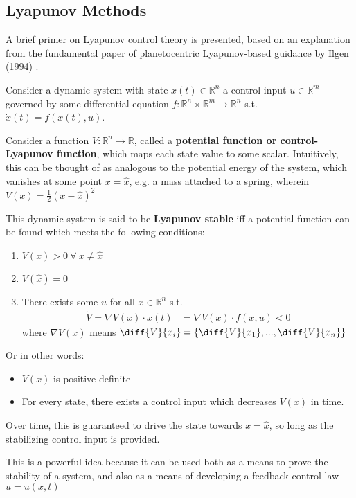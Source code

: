 \subsection{Lyapunov Methods}
A brief primer on Lyapunov control theory is presented, based on an explanation from the fundamental paper of planetocentric Lyapunov-based guidance by Ilgen (1994) \cite{ilgen1994low}.

Consider a dynamic system with state \(x(t) \in \mathbb{R}^n\) a control input \(u \in \mathbb{R}^m\) governed by some differential equation \(f : \mathbb{R}^n \times \mathbb{R}^m \to \mathbb{R}^n\) s.t. \(\dot{x}(t) = f(x(t), u)\).

Consider a function \(V: \mathbb{R}^n \to \mathbb{R}\), called a \textbf{potential function or control-Lyapunov function}, which maps each state value to some scalar. Intuitively, this can be thought of as analogous to the potential energy of the system, which vanishes at some point \(x = \hat{x}\), e.g. a mass attached to a spring, wherein \(V(x) = \frac{1}{2}(x-\hat{x})^2\)

This dynamic system is said to be \textbf{Lyapunov stable} iff a potential function can be found which meets the following conditions:
\begin{enumerate}
  \item \(V(x) > 0\  \forall \ x \neq \hat{x}\)
  \item \(V(\hat{x}) = 0\)
  \item There exists some \(u\) for all \(x \in \mathbb{R}^n\) s.t.
        \begin{align*}
          \dot{V}= \nabla V(x) \cdot \dot{x}(t) & = \nabla V(x) \cdot f(x, u) < 0
        \end{align*}
        where \(\nabla V(x)\) means \(\diff{V}{{x_i}} = \left\{\diff{V}{{x_1}}, ..., \diff{V}{{x_n}}  \right\}\)
\end{enumerate}
Or in other words:
\begin{itemize}
  \item \(V(x)\) is positive definite
  \item For every state, there exists a control input which decreases \(V(x)\) in time.
\end{itemize}

Over time, this is guaranteed to drive the state towards \(x = \hat{x}\), so long as the stabilizing control input is provided.

This is a powerful idea because it can be used both as a means to prove the stability of a system, and also as a means of developing a feedback control law \(u = u(x, t)\)

